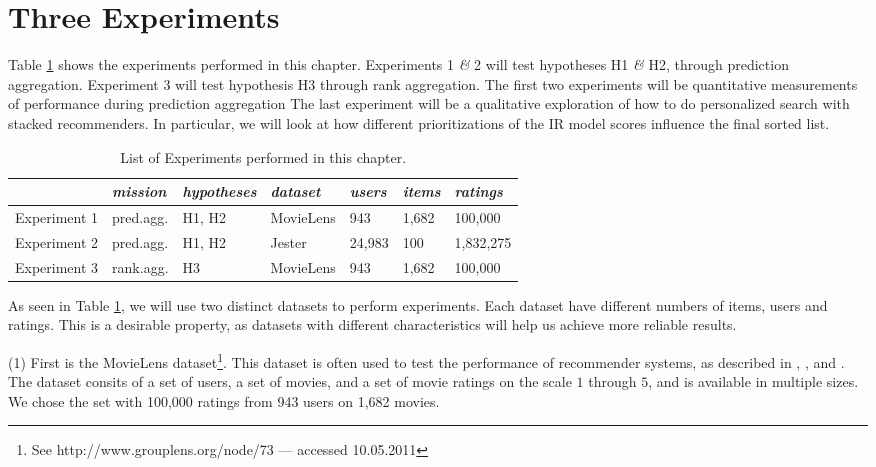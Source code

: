\section{Three Experiments}

Table \ref{table:experiments} shows the experiments performed in this chapter.
Experiments 1 \emph{\&} 2 will test hypotheses H1 \emph{\&} H2, through prediction aggregation.
Experiment 3 will test hypothesis H3 through rank aggregation.
The first two experiments will be quantitative measurements of performance during prediction aggregation
The last experiment will be a qualitative exploration
of how to do personalized search with stacked recommenders.
In particular, we will look at how different 
prioritizations of the IR model scores influence the
final sorted list.

\vspace{1em}
\begin{table}[h]
  \begin{tabular*}{\textwidth}{ l l l l l l l }
    \toprule
      ~ & 
      \emph{mission} &
      \emph{hypotheses} &
      \emph{dataset} &
      \emph{users} &
      \emph{items} &
      \emph{ratings} \\
    \midrule
    
    Experiment 1 &
    pred.agg. &
    H1, H2 &
    MovieLens &
    943 &
    1,682 &
    100,000 \\
    
    Experiment 2 &
    pred.agg. &
    H1, H2 &
    Jester &
    24,983 &
    100 &
    1,832,275 \\

    Experiment 3 &
    rank.agg. &
    H3 &
    MovieLens &
    943 &
    1,682 &
    100,000 \\

    
    \bottomrule 
  \end{tabular*}
  \caption[List of Experiments]{List of Experiments performed in this chapter.}
  \label{table:experiments}
\end{table}


As seen in Table \ref{table:experiments}, 
we will use two distinct datasets to perform experiments.
Each dataset have different numbers of items, users and ratings.
This is a desirable property, as datasets with different
characteristics will help us achieve more reliable results.

(1) First is the MovieLens dataset\footnote{
See http://www.grouplens.org/node/73 --- accessed 10.05.2011}.
This dataset is often used to test the performance of recommender systems,
as described in 
\citet[p9]{Alshamri2008}, \citet[p4]{Lemire2005}, \citet[p1]{Adomavicius2005} and \citet[p2]{Herlocker2004}.
The dataset consits of a set of users, a set of movies, and a set of movie ratings
on the scale $1$ through $5$, and is available in multiple sizes.
We chose the set with 100,000 ratings from 943 users on 1,682 movies.

